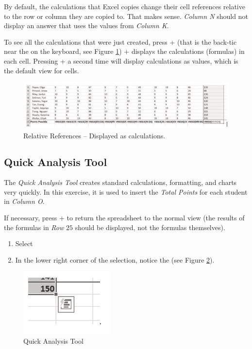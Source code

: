 By default, the calculations that Excel copies change their cell references relative to the row or column they are copied to. That makes sense. \textit{Column N} should not display an answer that uses the values from \textit{Column K}.

To see all the calculations that were just created, press  +  (that is the back-tic near the  on the keyboard, see Figure \ref{03:fig03})  +  displays the calculations (formulas) in each cell. Pressing  +  a second time will display calculations as values, which is the default view for cells.

\begin{figure}[H]
	\centering
	\includegraphics[width=\maxwidth{.95\linewidth}]{gfx/ch03_fig03}
	\caption{Relative References – Displayed as calculations.}
	\label{03:fig03}
\end{figure}

\subsection{Quick Analysis Tool}

The \textit{Quick Analysis Tool} creates standard calculations, formatting, and charts very quickly. In this exercise, it is used to insert the \textit{Total Points} for each student in \textit{Column O}.

If necessary, press  +  to return the spreadsheet to the normal view (the results of the formulas in \textit{Row }$ 25 $ should be displayed, not the formulas themselves).

\begin{enumerate}
	\item Select 
	\item In the lower right corner of the selection, notice the  (see Figure \ref{03:fig04}).
\end{enumerate}

\begin{figure}[H]
	\centering
	\includegraphics[width=\maxwidth{.95\linewidth}]{gfx/ch03_fig04}
	\caption{Quick Analysis Tool}
	\label{03:fig04}
\end{figure}

